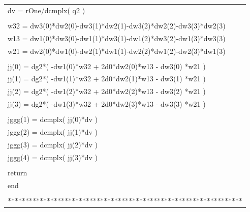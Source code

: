 \documentclass[a4paper,11pt]{article}
\begin{document}
\begin{center}
{\begin{supertabular}{l}
      \hspace{0.5em} dv = rOne/dcmplx( q2 )\\
\\
      \hspace{0.5em} w32 = dw3(0)*dw2(0)-dw3(1)*dw2(1)-dw3(2)*dw2(2)-dw3(3)*dw2(3)\\
      \hspace{0.5em} w13 = dw1(0)*dw3(0)-dw1(1)*dw3(1)-dw1(2)*dw3(2)-dw1(3)*dw3(3)\\
      \hspace{0.5em} w21 = dw2(0)*dw1(0)-dw2(1)*dw1(1)-dw2(2)*dw1(2)-dw2(3)*dw1(3)\\
\\
      \hspace{0.5em} jj(0) = dg2*( -dw1(0)*w32 + 2d0*dw2(0)*w13 - dw3(0) *w21 )\\
      \hspace{0.5em} jj(1) = dg2*( -dw1(1)*w32 + 2d0*dw2(1)*w13 - dw3(1) *w21 )\\
      \hspace{0.5em} jj(2) = dg2*( -dw1(2)*w32 + 2d0*dw2(2)*w13 - dw3(2) *w21 )\\
      \hspace{0.5em} jj(3) = dg2*( -dw1(3)*w32 + 2d0*dw2(3)*w13 - dw3(3) *w21 )\\
\\
      \hspace{0.5em} jggg(1) = dcmplx( jj(0)*dv )\\
      \hspace{0.5em} jggg(2) = dcmplx( jj(1)*dv )\\
      \hspace{0.5em} jggg(3) = dcmplx( jj(2)*dv )\\
      \hspace{0.5em} jggg(4) = dcmplx( jj(3)*dv )\\
\\
      \hspace{0.5em} return\\
      \hspace{0.5em} end\\\\
******************************************************************\\
\end{supertabular}
}\\


\end{center}
\end{document}
